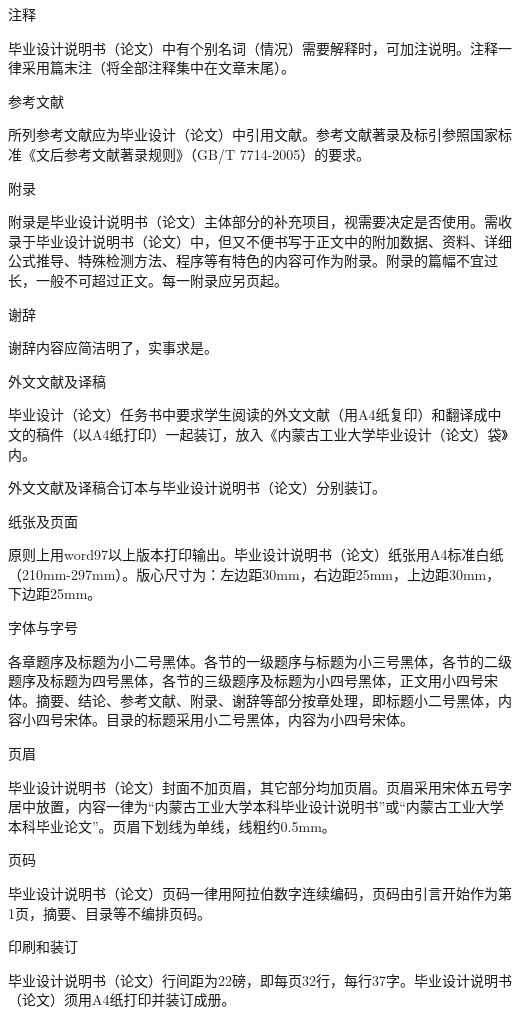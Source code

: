 \documentclass{imutthesis}
\begin{document}
\begin{enumerate}
{\bfseries	\item 注释}
\par\qquad 毕业设计说明书（论文）中有个别名词（情况）需要解释时，可加注说明。注释一律采用篇末注（将全部注释集中在文章末尾）。

{\bfseries	\item 参考文献}
\par\qquad 所列参考文献应为毕业设计（论文）中引用文献。参考文献著录及标引参照国家标准《文后参考文献著录规则》（GB/T 7714-2005）的要求。

{\bfseries	\item 附录}
\par\qquad 附录是毕业设计说明书（论文）主体部分的补充项目，视需要决定是否使用。需收录于毕业设计说明书（论文）中，但又不便书写于正文中的附加数据、资料、详细公式推导、特殊检测方法、程序等有特色的内容可作为附录。附录的篇幅不宜过长，一般不可超过正文。每一附录应另页起。

{\bfseries	\item 谢辞}
\par\qquad 谢辞内容应简洁明了，实事求是。

{\bfseries	\item 外文文献及译稿}
\par\qquad 毕业设计（论文）任务书中要求学生阅读的外文文献（用A4纸复印）和翻译成中文的稿件（以A4纸打印）一起装订，放入《内蒙古工业大学毕业设计（论文）袋》内。

\qquad 外文文献及译稿合订本与毕业设计说明书（论文）分别装订。

{\bfseries	\item 纸张及页面}
\par\qquad 原则上用word97以上版本打印输出。毕业设计说明书（论文）纸张用A4标准白纸（210mm-297mm）。版心尺寸为：左边距30mm，右边距25mm，上边距30mm，下边距25mm。

{\bfseries	\item 字体与字号}
\par\qquad 各章题序及标题为小二号黑体。各节的一级题序与标题为小三号黑体，各节的二级题序及标题为四号黑体，各节的三级题序及标题为小四号黑体，正文用小四号宋体。摘要、结论、参考文献、附录、谢辞等部分按章处理，即标题小二号黑体，内容小四号宋体。目录的标题采用小二号黑体，内容为小四号宋体。

{\bfseries	\item 页眉}
\par\qquad 毕业设计说明书（论文）封面不加页眉，其它部分均加页眉。页眉采用宋体五号字居中放置，内容一律为“内蒙古工业大学本科毕业设计说明书”或“内蒙古工业大学本科毕业论文”。页眉下划线为单线，线粗约0.5mm。

{\bfseries	\item 页码}
\par\qquad 毕业设计说明书（论文）页码一律用阿拉伯数字连续编码，页码由引言开始作为第1页，摘要、目录等不编排页码。

{\bfseries	\item 印刷和装订}
\par\qquad 毕业设计说明书（论文）行间距为22磅，即每页32行，每行37字。毕业设计说明书（论文）须用A4纸打印并装订成册。

\end{enumerate}
\end{document}
